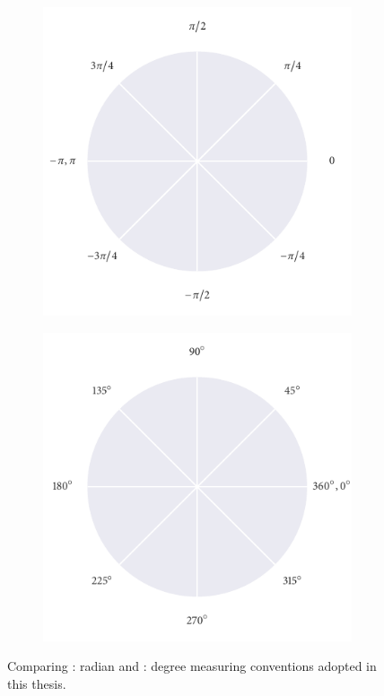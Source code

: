 \begin{figure}
\centering
	\begin{subfigure}[b]{0.5\textwidth}
		\includegraphics{radian_axes.pdf}
		\caption{}
		\label{subfig:radian_axes}
	\end{subfigure}%
	\begin{subfigure}[b]{0.5\textwidth}
		\centering
		\includegraphics{degree_axes.pdf}
		\caption{}
		\label{subfig:degree_axes}
	\end{subfigure}
	\caption{Comparing : radian and : degree 
measuring conventions adopted in this thesis.}
	\label{fig:compare_axes}
\end{figure}

